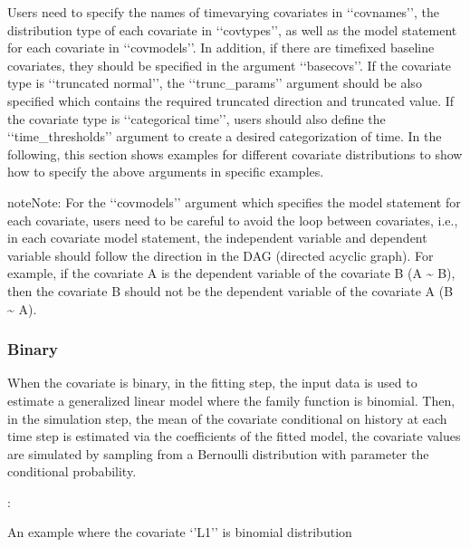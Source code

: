 \documentclass[letterpaper,10pt,english]{sphinxmanual}
\begin{document}
\sphinxAtStartPar
Users need to specify the names of time\sphinxhyphen{}varying covariates in ‘‘covnames’’, the distribution type
of each covariate in ‘‘covtypes’’, as well as the model statement for each covariate in ‘‘covmodels’’.
In addition, if there are time\sphinxhyphen{}fixed baseline covariates, they should be specified in the argument ‘‘basecovs’’.
If the covariate type is ‘‘truncated normal’’, the ‘‘trunc\_params’’ argument should be also specified which contains
the required truncated direction and truncated value. If the covariate type is ‘‘categorical time’’, users should
also define the ‘‘time\_thresholds’’ argument to create a desired categorization of time.
In the following, this section shows examples for different covariate distributions to show how to specify the above arguments
in specific examples.

\begin{sphinxadmonition}{note}{Note:}
\sphinxAtStartPar
For the ‘‘covmodels’’ argument which specifies the model statement for each covariate, users need to be careful to
avoid the loop between covariates, i.e., in each covariate model statement, the independent variable and dependent
variable should follow the direction in the DAG (directed acyclic graph). For example, if the covariate A is the
dependent variable of the covariate B (A \textasciitilde{} B), then the covariate B should not be the dependent variable of the
covariate A (B \textasciitilde{} A).
\end{sphinxadmonition}


\subsubsection{Binary}
\label{\detokenize{Specifications/Covariate models:binary}}
\sphinxAtStartPar
When the covariate is binary, in the fitting step, the input data is used to estimate a generalized linear model where
the family function is binomial. Then, in the simulation step, the mean of the covariate conditional on history
at each time step is estimated via the coefficients of the fitted model, the covariate values are simulated
by sampling from a Bernoulli distribution with parameter the conditional probability.

\sphinxAtStartPar
{}:

\sphinxAtStartPar
An example where the covariate ‘’L1’’ is binomial distribution
\end{document}

